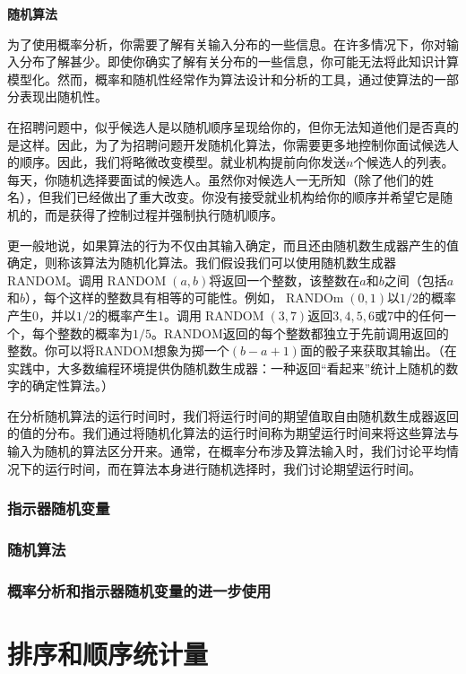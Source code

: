 \documentclass[lang=cn,newtx,10pt,scheme=chinese]{elegantbook}
\begin{document}
\textbf{随机算法}

为了使用概率分析，你需要了解有关输入分布的一些信息。在许多情况下，你对输入分布了解甚少。即使你确实了解有关分布的一些信息，你可能无法将此知识计算模型化。然而，概率和随机性经常作为算法设计和分析的工具，通过使算法的一部分表现出随机性。

在招聘问题中，似乎候选人是以随机顺序呈现给你的，但你无法知道他们是否真的是这样。因此，为了为招聘问题开发随机化算法，你需要更多地控制你面试候选人的顺序。因此，我们将略微改变模型。就业机构提前向你发送$n$个候选人的列表。每天，你随机选择要面试的候选人。虽然你对候选人一无所知（除了他们的姓名），但我们已经做出了重大改变。你没有接受就业机构给你的顺序并希望它是随机的，而是获得了控制过程并强制执行随机顺序。

更一般地说，如果算法的行为不仅由其输入确定，而且还由随机数生成器产生的值确定，则称该算法为随机化算法。我们假设我们可以使用随机数生成器RANDOM。调用$\operatorname{RANDOM}(a,b)$将返回一个整数，该整数在$a$和$b$之间（包括$a$和$b$），每个这样的整数具有相等的可能性。例如，$\operatorname{RANDOm}(0,1)$以$1/2$的概率产生0，并以$1/2$的概率产生1。调用$\operatorname{RANDOM}(3,7)$返回$3,4,5,6$或7中的任何一个，每个整数的概率为$1/5$。RANDOM返回的每个整数都独立于先前调用返回的整数。你可以将RANDOM想象为掷一个$(b-a+1)$面的骰子来获取其输出。（在实践中，大多数编程环境提供伪随机数生成器：一种返回“看起来”统计上随机的数字的确定性算法。）

在分析随机算法的运行时间时，我们将运行时间的期望值取自由随机数生成器返回的值的分布。我们通过将随机化算法的运行时间称为期望运行时间来将这些算法与输入为随机的算法区分开来。通常，在概率分布涉及算法输入时，我们讨论平均情况下的运行时间，而在算法本身进行随机选择时，我们讨论期望运行时间。

\section{指示器随机变量}

\section{随机算法}

\section{概率分析和指示器随机变量的进一步使用}

\part{排序和顺序统计量}
\end{document}
